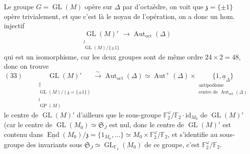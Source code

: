 \documentclass[11pt,a4paper]{article}
\begin{document}
Le groupe $G = \operatorname{GL}(M)$ opère sur $\Delta$ par  d'octaèdre, on voit que $\mathfrak{z} = \{\pm 1\}$ opère trivialement, \struck{\ill{}} et  que c'est là le noyau de l'opération, on a donc un hom. injectif
\[
  \underset{\substack{\wr\\ \operatorname{GL}(M)/\{\pm 1\}}}{\operatorname{GL}(M)'} \longrightarrow \operatorname{Aut}_{\mathrm{oct}}(\Delta)
\]
qui est un isomorphisme, car les deux groupes sont de même ordre $24 \times 2 = 48$, donc on trouve
\[
  (33) \qquad
  \underset{\substack{\|\\ \operatorname{GL}(M)/(\mathfrak{z} = \{\pm 1\})\\ \wr\\ \operatorname{GP}(M)}}{\operatorname{GL}(M)'} \xrightarrow{\;\sim\;} \operatorname{Aut}_{\mathrm{oct}}(\Delta) \simeq \operatorname{Aut}^+(\Delta) \times \underset{\substack{\text{antipodisme}\\ \text{centre de } \operatorname{Aut}_{\mathrm{oct}}(\Delta)}}{\{1, \underline{a}_\Delta\}}
\]
le centre de $\operatorname{GL}(M)'$   d'ailleurs que le sous-groupe $\mathbb{F}_2^{\underline{\omega}}/\mathbb{F}_2 \cdot \mathrm{id}_{M_0}$ de $\operatorname{GL}(M)'$ (car le centre de $\operatorname{GL}(M_0) \simeq \mathfrak{S}_J$ est nul, donc le centre de $\operatorname{GL}(M)'$ est contenu dans $\underline{\operatorname{End}}(M_0)/\mathfrak{z} = \{1_{M_0}, \ldots\} \simeq M_0 \times \mathbb{F}_2^{\underline{\omega}}/\mathbb{F}_2$, et s'identifie au sous-groupe des invariants sous $\mathfrak{S}_J \simeq \operatorname{GL}_{\mathbb{F}_2}(M_0)$ de ce groupe, c'est $\mathbb{F}_2^{\underline{\omega}}/\mathbb{F}_2$.
\end{document}

